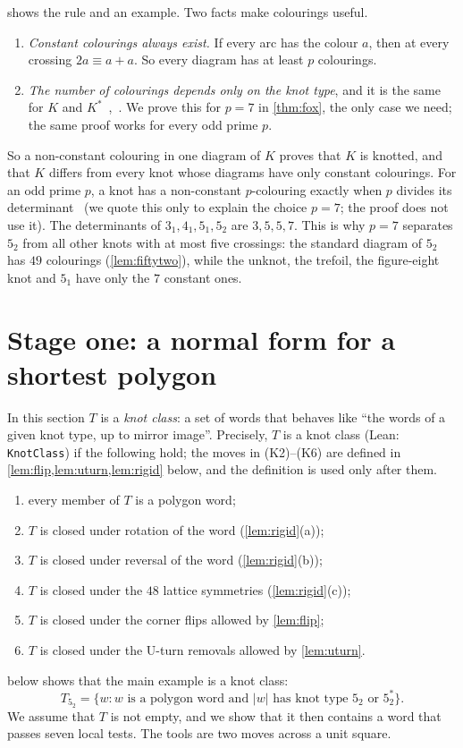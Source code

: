 \documentclass[11pt]{article}
\theoremstyle{plain}
\theoremstyle{definition}
\theoremstyle{remark}
\newcommand{\lean}[1]{\texttt{#1}}
\begin{document}
 shows the rule and an example. Two facts make colourings useful.

\begin{enumerate}[leftmargin=*]
\item \emph{Constant colourings always exist.} If every arc has the colour $a$, then at every crossing
$2a\equiv a+a$. So every diagram has at least $p$ colourings.
\item \emph{The number of colourings depends only on the knot type}, and it is the same for $K$ and
$K^*$~\cite{Fox62,Prz98},~\cite[\S3.3]{Liv93}. We prove this for $p=7$ in \cref{thm:fox}, the only case we need;
the same proof works for every odd prime $p$.
\end{enumerate}

So a non-constant colouring in one diagram of $K$ proves that $K$ is knotted, and that $K$ differs
from every knot whose diagrams have only constant colourings. For an odd prime $p$, a knot has a
non-constant $p$-colouring exactly when $p$ divides its determinant~\cite[\S\S3.3--3.4]{Liv93} (we quote this
only to explain the choice $p=7$; the proof does not use it). The
determinants of $3_1,4_1,5_1,5_2$ are $3,5,5,7$. This is why $p=7$ separates $5_2$ from all other knots
with at most five crossings: the standard diagram of $5_2$ has $49$ colourings (\cref{lem:fiftytwo}), while the
unknot, the trefoil, the figure-eight knot and $5_1$ have only the $7$ constant ones.

\section{Stage one: a normal form for a shortest polygon}\label{sec:normal}

In this section $T$ is a \emph{knot class}: a set of words that behaves like ``the words of a given knot
type, up to mirror image''. Precisely, $T$ is a knot class (Lean: \lean{KnotClass}) if the following hold; the
moves in (K2)--(K6) are defined in \cref{lem:flip,lem:uturn,lem:rigid} below, and the definition is used
only after them.
\begin{enumerate}[label=(K\arabic*)]
\item every member of $T$ is a polygon word;
\item $T$ is closed under rotation of the word (\cref{lem:rigid}(a));
\item $T$ is closed under reversal of the word (\cref{lem:rigid}(b));
\item $T$ is closed under the $48$ lattice symmetries (\cref{lem:rigid}(c));
\item $T$ is closed under the corner flips allowed by \cref{lem:flip};
\item $T$ is closed under the U-turn removals allowed by \cref{lem:uturn}.
\end{enumerate}
 below shows that the main example is a knot class:
\[ T_{5_2}=\{w : w \text{ is a polygon word and } |w| \text{ has knot type } 5_2 \text{ or } 5_2^*\}. \]
We assume that $T$ is not empty, and we show that it then contains a word that
passes seven local tests. The tools are two moves across a unit square.
\end{document}
